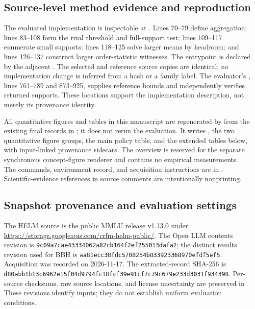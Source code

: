 \documentclass{article}
\begin{document}
\subsection{Source-level method evidence and reproduction}
The evaluated implementation is inspectable at
.
Lines 70--79 define aggregation; lines 83--108 form the rival threshold and full-support test; lines 109--117 enumerate small supports; lines 118--125 solve larger means by headroom; and lines 126--137 construct larger order-statistic witnesses. The entrypoint is declared by the adjacent . The selected and reference source copies are identical; no implementation change is inferred from a hash or a family label. The evaluator's , lines 761--789 and 873--925, supplies reference bounds and independently verifies returned supports. These locations support the implementation description, not merely its provenance identity.

All quantitative figures and tables in this manuscript are regenerated by
 from the existing final records in
; it does not rerun the evaluation. It writes
, the two quantitative figure groups, the main policy table, and the extended tables below, with input-linked provenance sidecars. The overview is reserved for the separate synchronous concept-figure renderer and contains no empirical measurements. The commands, environment record, and acquisition instructions are in . Scientific-evidence references in source comments are intentionally nonprinting.

\subsection{Snapshot provenance and evaluation settings}
The HELM source is the public MMLU release v1.13.0 under
\url{https://storage.googleapis.com/crfm-helm-public/}.
The Open LLM contents revision is
\texttt{9c09a7cae43334062a82cb164f2ef255013dafa2}; the distinct results revision used for BBH is
\texttt{aa81ecc38fdc5708254b833923368970efdf5ef5}.
Acquisition was recorded on 2026-11-17. The extracted-record SHA-256 is
\texttt{d80abb1b13c6962e15f04d9794fc18fcf39e91cf7c79c679e233d3031f934398}.
Per-source checksums, raw source locations, and license uncertainty are preserved in . These revisions identify inputs; they do not establish uniform evaluation conditions.
\end{document}
